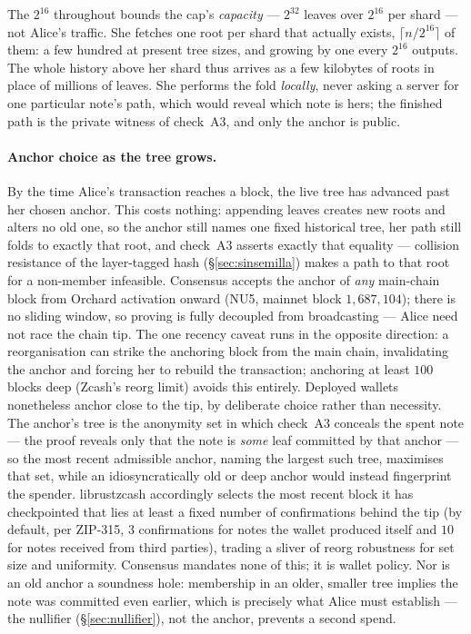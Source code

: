 \documentclass[11pt,a4paper]{article}
\theoremstyle{definition}
\begin{document}
The $2^{16}$ throughout bounds the cap's \emph{capacity} --- $2^{32}$ leaves over
$2^{16}$ per shard --- not Alice's traffic. She fetches one root per shard that
actually exists, $\lceil n/2^{16} \rceil$ of them: a few hundred at present tree
sizes, and growing by one every $2^{16}$ outputs. The whole history above her
shard thus arrives as a few kilobytes of roots in place of millions of leaves.
She performs the fold \emph{locally}, never asking a server for one particular
note's path, which would reveal which note is hers; the finished path is the
private witness of check~A3, and only the anchor is public.

\paragraph{Anchor choice as the tree grows.}
By the time Alice's transaction reaches a block, the live tree has advanced
past her chosen anchor. This costs nothing: appending leaves creates new
roots and alters no old one, so the anchor still names one fixed historical
tree, her path still folds to exactly that root, and check~A3 asserts exactly
that equality --- collision resistance of the layer-tagged hash
(\S\ref{sec:sinsemilla}) makes a path to that root for a non-member
infeasible. Consensus accepts the anchor of \emph{any} main-chain block from
Orchard activation onward (NU5, mainnet block $1{,}687{,}104$); there is no
sliding window, so proving is fully decoupled from broadcasting --- Alice
need not race the chain tip. The one recency caveat runs in the opposite
direction: a reorganisation can strike the anchoring block from the main
chain, invalidating the anchor and forcing her to rebuild the transaction;
anchoring at least $100$ blocks deep (Zcash's reorg limit) avoids this
entirely. Deployed wallets nonetheless anchor close to the tip, by
deliberate choice rather than necessity. The anchor's tree is the anonymity
set in which check~A3 conceals the spent note --- the proof reveals only that
the note is \emph{some} leaf committed by that anchor --- so the most recent
admissible anchor, naming the largest such tree, maximises that set, while an
idiosyncratically old or deep anchor would instead fingerprint the spender.
\textsf{librustzcash} accordingly selects the most recent block it has
checkpointed that lies at least a fixed number of confirmations behind the tip
(by default, per ZIP-315, $3$ confirmations for notes the wallet produced
itself and $10$ for notes received from third parties), trading a sliver of
reorg robustness for set size and uniformity. Consensus mandates none of this;
it is wallet policy. Nor is an old anchor a soundness hole: membership in an older,
smaller tree implies the note was committed even earlier, which is precisely
what Alice must establish --- the nullifier (\S\ref{sec:nullifier}), not the
anchor, prevents a second spend.
\end{document}
